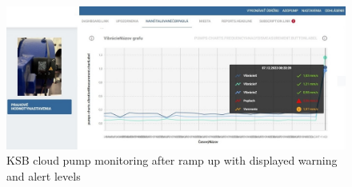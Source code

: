 
\begin{figure}[ht]
    \centering
    \includegraphics[width=\textwidth]{assets/design/ksb-cloud.jpg}
     \caption{KSB cloud pump monitoring after ramp up with displayed warning and alert levels}
\end{figure}
